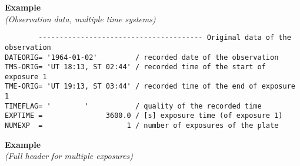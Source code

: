 \documentclass[11pt]{ivoa}
\newenvironment{fitsexample}[1]
{\bigskip\noindent\textbf{Example}\\\textit{(#1\smallskip)}}
{\medskip}
\begin{document}
\begin{fitsexample}{Observation data, multiple time systems}
\begin{lstlisting}
        --------------------------------------- Original data of the observation
DATEORIG= '1964-01-02'         / recorded date of the observation
TMS-ORIG= 'UT 18:13, ST 02:44' / recorded time of the start of exposure 1
TME-ORIG= 'UT 19:13, ST 03:44' / recorded time of the end of exposure 1
TIMEFLAG= '        '           / quality of the recorded time
EXPTIME =               3600.0 / [s] exposure time (of exposure 1)
NUMEXP  =                    1 / number of exposures of the plate
\end{lstlisting}
\end{fitsexample}


\begin{fitsexample}{Full header for multiple exposures}


\end{fitsexample}
\end{document}

